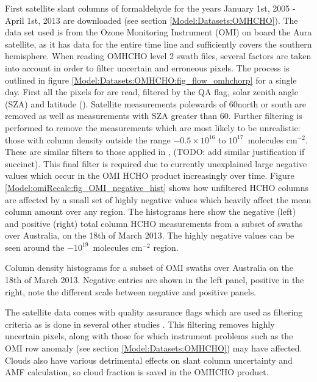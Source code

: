     First satellite slant columns of formaldehyde for the years January 1st, 2005 - April 1st, 2013 are downloaded (see section \ref{Model:Datasets:OMHCHO}).
    The data set used is from the Ozone Monitoring Instrument (OMI) on board the Aura satellite, as it has data for the entire time line and sufficiently covers the southern hemisphere.
    When reading OMHCHO level 2 swath files, several factors are taken into account in order to filter uncertain and erroneous pixels.
    The process is outlined in figure  \ref{Model:Datasets:OMHCHO:fig_flow_omhchorp} for a single day.
    First all the pixels for are read, filtered by the QA flag, solar zenith angle (SZA) and latitude (\textcite{Palmer2001}).
    Satellite measurements polewards of 60\degr north or south are removed as well as measurements with SZA greater than 60\degr.
    Further filtering is performed to remove the measurements which are most likely to be unrealistic: those with column density outside the range $-0.5 \times 10^{16}$ to $10^{17} $~molecules cm$^{-2}$.
    These are similar filters to those applied in \textcite{Zhu2016}, (TODO: add similar justification if succinct).
    This final filter is required due to currently unexplained large negative values which occur in the OMI HCHO product increasingly over time.
    Figure \ref{Model:omiRecalc:fig_OMI_negative_hist} shows how unfiltered HCHO columns are affected by a small set of highly negative values which heavily affect the mean column amount over any region.
    The histograms here show the negative (left) and positive (right) total column HCHO measurements from a subset of swaths over Australia, on the 18th of March 2013.
    The highly negative values can be seen around the $-10^{19}$~molecules cm$^{-2}$ region.
    
    {Column density histograms for a subset of OMI swaths over Australia on the 18th of March 2013.
      Negative entries are shown in the left panel, positive in the right, note the different scale between negative and positive panels.}
    {\label{Model:omiRecalc:fig_OMI_negative_hist}}
    
    The satellite data comes with quality assurance flags which are used as filtering criteria as is done in several other studies \parencite[eg.]{Marais2012, Barkley2013, Bauwens2016, Zhu2016}.
    This filtering removes highly uncertain pixels, along with those for which instrument problems such as the OMI row anomaly (see section \ref{Model:Datasets:OMHCHO}) may have affected.
    Clouds also have various detrimental effects on slant column uncertainty and AMF calculation, so cloud fraction is saved in the OMHCHO product.
    
